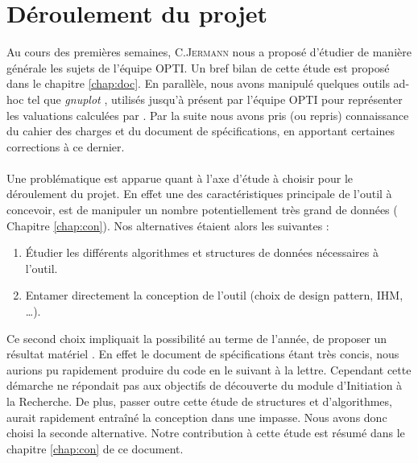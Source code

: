 \section{Déroulement du projet}
Au cours des premières semaines, C.\textsc{Jermann} nous a proposé d'étudier de manière générale les sujets de l'équipe \textsc{OPTI}. Un bref bilan de cette étude est proposé dans le chapitre \ref{chap:doc}. En parallèle, nous avons manipulé quelques outils ad-hoc tel que \emph{gnuplot} \cite{gnu}, utilisés jusqu'à présent par l'équipe \textsc{OPTI} pour représenter les valuations calculées par \realpaver. Par la suite nous avons pris (ou repris) connaissance du cahier des charges et du document de spécifications, en apportant certaines corrections à ce dernier. 

\paragraph{}Une problématique est apparue quant à l'axe d'étude à choisir pour le déroulement du projet. En effet une des caractéristiques principale de l'outil à concevoir, est de manipuler un nombre potentiellement très grand de données (\cf{} Chapitre \ref{chap:con}). Nos alternatives étaient alors les suivantes : 
\begin{enumerate}
\item
Étudier les différents algorithmes et structures de données nécessaires à l'outil.
\item
Entamer directement la conception de l'outil (choix de design pattern, IHM, \dots).
\end{enumerate} 
Ce second choix impliquait la possibilité au terme de l'année, de proposer un résultat \og matériel \fg{}. En effet le document de spécifications étant très concis, nous aurions pu rapidement produire du code en le suivant à la lettre. Cependant cette démarche ne répondait pas aux objectifs de découverte du module d'Initiation à la Recherche. De plus, passer outre cette étude de structures et d'algorithmes, aurait rapidement entraîné la conception dans une impasse. Nous avons donc choisi la seconde alternative. Notre contribution à cette étude est résumé dans le chapitre \ref{chap:con} de ce document.


